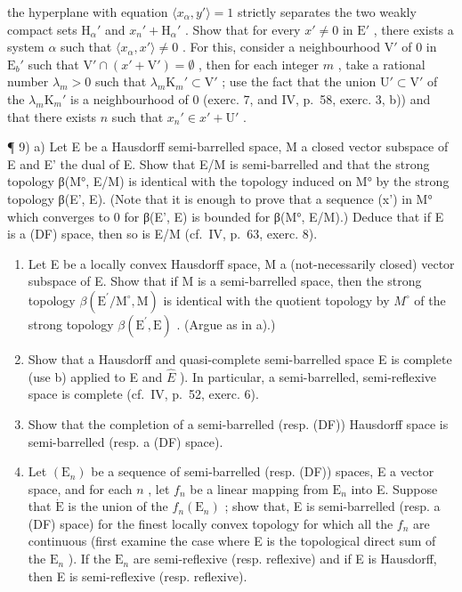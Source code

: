 the hyperplane with equation \(\langle x_{\alpha}, y' \rangle = 1\) strictly separates the two weakly compact sets \(\mathrm{H}_{\alpha}'\) and \(x_{n}' + \mathrm{H}_{\alpha}'\) . Show that for every \(x' \neq 0\) in \(\mathrm{E}'\) , there exists a system \(\alpha\) such that \(\langle x_{\alpha}, x' \rangle \neq 0\) . For this, consider a neighbourhood \(\mathrm{V}'\) of 0 in \(\mathrm{E}_b'\) such that \(\mathrm{V}' \cap (x' + \mathrm{V}') = \emptyset\) , then for each integer \(m\) , take a rational number \(\lambda_m > 0\) such that \(\lambda_m \mathrm{K}_m' \subset \mathrm{V}'\) ; use the fact that the union \(\mathrm{U}' \subset \mathrm{V}'\) of the \(\lambda_m \mathrm{K}_m'\) is a neighbourhood of 0 (exerc. 7, and IV, p.~58, exerc. 3, b)) and that there exists \(n\) such that \(x_n' \in x' + \mathrm{U}'\) .

¶ 9) a) Let E be a Hausdorff semi-barrelled space, M a closed vector subspace of E and E' the dual of E. Show that E/M is semi-barrelled and that the strong topology β(M°, E/M) is identical with the topology induced on M° by the strong topology β(E', E). (Note that it is enough to prove that a sequence (x') in M° which converges to 0 for β(E', E) is bounded for β(M°, E/M).) Deduce that if E is a (DF) space, then so is E/M (cf.~IV, p.~63, exerc. 8).

\begin{enumerate}
\def\labelenumi{\alph{enumi})}
\setcounter{enumi}{1}
\item
  Let E be a locally convex Hausdorff space, M a (not-necessarily closed) vector subspace of E. Show that if M is a semi-barrelled space, then the strong topology \(\beta(\mathrm{E}^{\prime}/\mathrm{M}^{\circ}, \mathrm{M})\) is identical with the quotient topology by \(M^{\circ}\) of the strong topology \(\beta(\mathrm{E}^{\prime}, \mathrm{E})\) . (Argue as in a).)
\item
  Show that a Hausdorff and quasi-complete semi-barrelled space E is complete (use b) applied to E and \(\hat{E}\) ). In particular, a semi-barrelled, semi-reflexive space is complete (cf.~IV, p.~52, exerc. 6).
\item
  Show that the completion of a semi-barrelled (resp. (DF)) Hausdorff space is semi-barrelled (resp. a (DF) space).
\item
  Let \((\mathrm{E}_n)\) be a sequence of semi-barrelled (resp. (DF)) spaces, E a vector space, and for each \(n\) , let \(f_n\) be a linear mapping from \(\mathrm{E}_n\) into E. Suppose that \(\dot{\mathrm{E}}\) is the union of the \(f_n(\mathrm{E}_n)\) ; show that, E is semi-barrelled (resp. a (DF) space) for the finest locally convex topology for which all the \(f_n\) are continuous (first examine the case where E is the topological direct sum of the \(\mathrm{E}_n\) ). If the \(\mathrm{E}_n\) are semi-reflexive (resp. reflexive) and if E is Hausdorff, then E is semi-reflexive (resp. reflexive).
\end{enumerate}

